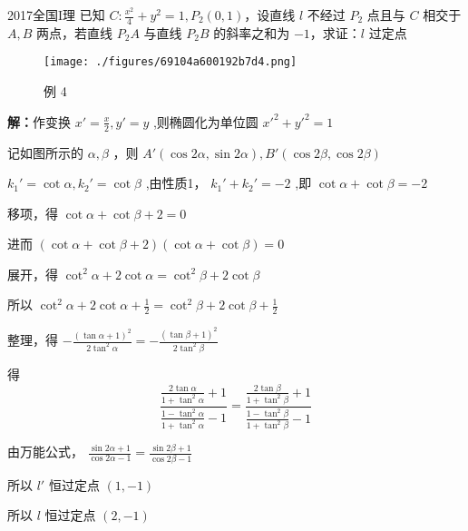 \begin{example}{2017全国I理}
已知 $\displaystyle{C:\frac{x^2}4+y^2=1,P_2(0,1)}$，设直线 $\displaystyle{l}$ 不经过 $\displaystyle{P_2}$ 点且与 $\displaystyle{C}$ 相交于 $\displaystyle{A,B}$ 两点，若直线 $\displaystyle{P_2A}$ 与直线 $\displaystyle{P_2B}$ 的斜率之和为 $\displaystyle{-1}$，求证：$\displaystyle{l}$ 过定点
\begin{figure}[ht]
\centering
\texttt{[image: ./figures/69104a600192b7d4.png]}
\caption{例 4} \label{fig_affine_11}
\end{figure}
\textbf{解：}作变换 $\displaystyle{x'=\frac{x}{2},y'=y}$ ,则椭圆化为单位圆 $\displaystyle{x'^2+y'^2=1}$

记如图所示的 $\displaystyle{\alpha,\beta}$ ，则 $\displaystyle{A'(\cos2\alpha,\sin2\alpha),B'(\cos2\beta,\cos2\beta)}$

$\displaystyle{k_1'=\cot{\alpha},k_2'=\cot{\beta}}$ ,由性质1， $\displaystyle{k_1'+k_2'=-2}$ ,即 $\displaystyle{\cot{\alpha}+\cot{\beta}=-2}$

移项，得 $\displaystyle{\cot\alpha+\cot \beta+2=0}$

进而 $\displaystyle{(\cot\alpha+\cot \beta+2)(\cot \alpha+\cot\beta)=0}$

展开，得 $\displaystyle{\cot^2\alpha+2\cot\alpha=\cot^2\beta+2\cot\beta}$

所以 $\displaystyle{\cot^2\alpha+2\cot\alpha+\frac{1}{2}=\cot^2\beta+2\cot\beta+\frac{1}{2}}$

整理，得 $\displaystyle{-\frac{(\tan\alpha+1)^2}{2\tan^2\alpha}=-\frac{(\tan\beta+1)^2}{2\tan^2\beta}}$

得 
$$\frac{\frac{2\tan\alpha}{1+\tan^2\alpha}+1}{\frac{1-\tan^2\alpha}{1+\tan^2\alpha}-1}=\frac{\frac{2\tan\beta}{1+\tan^2\beta}+1}{\frac{1-\tan^2\beta}{1+\tan^2\beta}-1}$$

由万能公式， $\displaystyle{\frac{\sin2\alpha+1}{\cos2\alpha-1}=\frac{\sin2\beta+1}{\cos2\beta-1}}$

所以 $\displaystyle{l'}$ 恒过定点 $\displaystyle{(1,-1)}$

所以 $\displaystyle{l}$ 恒过定点 $\displaystyle{(2,-1)}$ 
\end{example}
